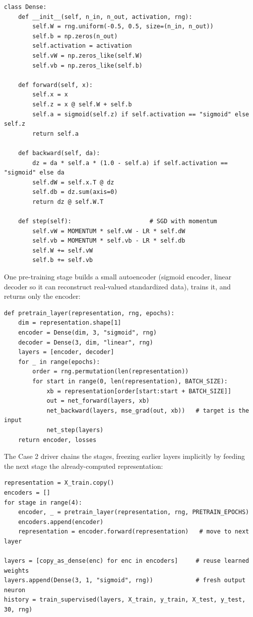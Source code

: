 \documentclass[12pt]{article}
\begin{document}
\begin{lstlisting}
class Dense:
    def __init__(self, n_in, n_out, activation, rng):
        self.W = rng.uniform(-0.5, 0.5, size=(n_in, n_out))
        self.b = np.zeros(n_out)
        self.activation = activation
        self.vW = np.zeros_like(self.W)
        self.vb = np.zeros_like(self.b)

    def forward(self, x):
        self.x = x
        self.z = x @ self.W + self.b
        self.a = sigmoid(self.z) if self.activation == "sigmoid" else self.z
        return self.a

    def backward(self, da):
        dz = da * self.a * (1.0 - self.a) if self.activation == "sigmoid" else da
        self.dW = self.x.T @ dz
        self.db = dz.sum(axis=0)
        return dz @ self.W.T

    def step(self):                      # SGD with momentum
        self.vW = MOMENTUM * self.vW - LR * self.dW
        self.vb = MOMENTUM * self.vb - LR * self.db
        self.W += self.vW
        self.b += self.vb
\end{lstlisting}

One pre-training stage builds a small autoencoder (sigmoid encoder, linear
decoder so it can reconstruct real-valued standardized data), trains it, and
returns only the encoder:

\begin{lstlisting}
def pretrain_layer(representation, rng, epochs):
    dim = representation.shape[1]
    encoder = Dense(dim, 3, "sigmoid", rng)
    decoder = Dense(3, dim, "linear", rng)
    layers = [encoder, decoder]
    for _ in range(epochs):
        order = rng.permutation(len(representation))
        for start in range(0, len(representation), BATCH_SIZE):
            xb = representation[order[start:start + BATCH_SIZE]]
            out = net_forward(layers, xb)
            net_backward(layers, mse_grad(out, xb))   # target is the input
            net_step(layers)
    return encoder, losses
\end{lstlisting}

The Case 2 driver chains the stages, freezing earlier layers implicitly by
feeding the next stage the already-computed representation:

\begin{lstlisting}
representation = X_train.copy()
encoders = []
for stage in range(4):
    encoder, _ = pretrain_layer(representation, rng, PRETRAIN_EPOCHS)
    encoders.append(encoder)
    representation = encoder.forward(representation)   # move to next layer

layers = [copy_as_dense(enc) for enc in encoders]     # reuse learned weights
layers.append(Dense(3, 1, "sigmoid", rng))            # fresh output neuron
history = train_supervised(layers, X_train, y_train, X_test, y_test, 30, rng)
\end{lstlisting}
\end{document}
